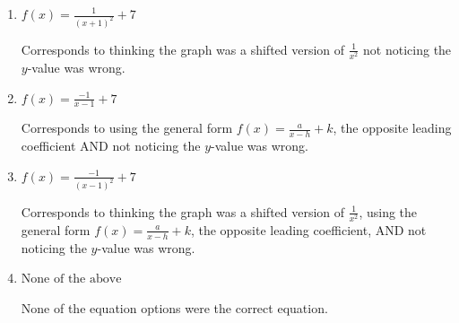 \documentclass{extbook}[14pt]
\begin{document}
\begin{enumerate}
{\begin{enumerate}[label=\Alph*.]
The $x$- and $y$-value of the equation does not match the graph.
\item \( f(x) = \frac{1}{(x + 1)^2} + 7 \)

Corresponds to thinking the graph was a shifted version of $\frac{1}{x^2}$ not noticing the $y$-value was wrong.
\item \( f(x) = \frac{-1}{x - 1} + 7 \)

Corresponds to using the general form $f(x) = \frac{a}{x-h}+k$, the opposite leading coefficient AND not noticing the $y$-value was wrong.
\item \( f(x) = \frac{-1}{(x - 1)^2} + 7 \)

Corresponds to thinking the graph was a shifted version of $\frac{1}{x^2}$, using the general form $f(x) = \frac{a}{x-h}+k$, the opposite leading coefficient, AND not noticing the $y$-value was wrong.
\item \( \text{None of the above} \)

None of the equation options were the correct equation.
\end{enumerate}

}
\end{enumerate}
\end{document}
